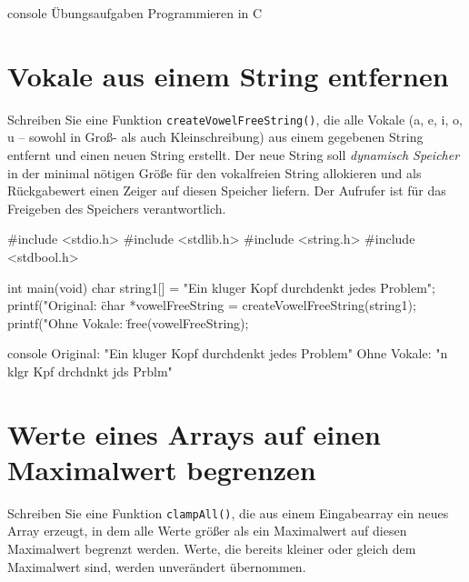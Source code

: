 \begin{mybox}[Bildschirmausgabe]{console}
Übungsaufgaben Programmieren in C
\end{mybox}




\chapter{Vokale aus einem String entfernen}

\vspace{10pt}

Schreiben Sie eine Funktion \texttt{createVowelFreeString()}, die alle
Vokale (a, e, i, o, u -- sowohl in Groß- als auch Kleinschreibung) aus einem
gegebenen String entfernt und einen neuen String erstellt. Der neue String soll
\textit{dynamisch Speicher} in der minimal nötigen Größe für den vokalfreien
String allokieren und als Rückgabewert einen Zeiger auf diesen Speicher liefern.
Der Aufrufer ist für das Freigeben des Speichers verantwortlich.

\Vorlage
\begin{codebox}[lang=c, fontsize=\small]
#include <stdio.h>
#include <stdlib.h>
#include <string.h>
#include <stdbool.h>

int main(void) {
    char string1[] = "Ein kluger Kopf durchdenkt jedes Problem";
    printf("Original:    \"%

    char *vowelFreeString = createVowelFreeString(string1);
    printf("Ohne Vokale: \"%

    free(vowelFreeString);
}
\end{codebox}

\begin{mybox}[Bildschirmausgabe]{console}
Original:    "Ein kluger Kopf durchdenkt jedes Problem"
Ohne Vokale: "n klgr Kpf drchdnkt jds Prblm"
\end{mybox}




\chapter{Werte eines Arrays auf einen Maximalwert begrenzen}

\vspace{10pt}

Schreiben Sie eine Funktion \texttt{clampAll()}, die aus einem
Eingabearray ein neues Array erzeugt, in dem alle Werte größer als ein
Maximalwert auf diesen Maximalwert begrenzt werden. Werte, die bereits kleiner
oder gleich dem Maximalwert sind, werden unverändert übernommen.

